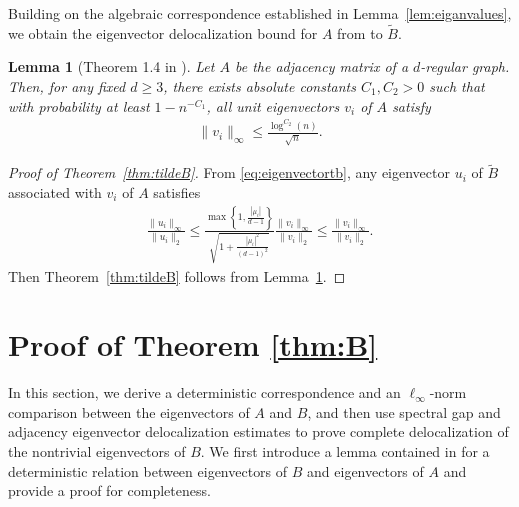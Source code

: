 \documentclass[11pt,reqno]{amsart}
\newtheorem{lemma}[theorem]{Lemma}
\theoremstyle{definition}
\begin{document}
{Building on the algebraic correspondence established in Lemma~\ref{lem:eiganvalues}, we obtain the eigenvector delocalization bound for $A$ from \cite{huang2021spectrum} to $\tilde B$.}

\begin{lemma}[Theorem 1.4 in \cite{huang2021spectrum}] \label{lem:A_delocalization}
{Let $A$ be the adjacency matrix of a $d$-regular graph.} Then, for any fixed $d\geq 3$, there exists absolute constants $C_1, C_2>0$ such that with probability at least $1-n^{-C_1}$, all unit eigenvectors $v_i$ of $A$ {satisfy}
    \begin{align}
        \|v_i\|_{\infty}\leq \frac{\log^{C_2}(n)}{\sqrt n}.
    \end{align}
\end{lemma}


\begin{proof}[Proof of Theorem~\ref{thm:tildeB}]
    From \eqref{eq:eigenvectortb}, any eigenvector $u_i$ of $\tilde B$ associated with $v_i$ of $A$ satisfies
    \begin{align}
        \frac{\|u_i\|_{\infty}}{\|u_i\|_2} \leq \frac{\max \left\{ 1, \frac{|\mu_i|}{d-1}\right\}}{\sqrt{1+\frac{|\mu_i|^2}{(d-1)^2}}}\frac{\|v_i\|_{\infty}}{\|v_i\|_2}\leq \frac{\|v_i\|_{\infty}}{\|v_i\|_2}.
    \end{align}
    Then Theorem~\ref{thm:tildeB} follows from Lemma~\ref{lem:A_delocalization}.
\end{proof}






\section{Proof of Theorem \ref{thm:B}}
\label{sec:thm3}


{In this section, we derive a deterministic correspondence and an $\ell_\infty$-norm comparison between the eigenvectors of $A$ and $B$, and then use spectral gap and adjacency eigenvector delocalization estimates to prove complete delocalization of the nontrivial eigenvectors of $B$.}
We first introduce a lemma contained in \cite{lubetzky2016cutoff} for a deterministic relation between eigenvectors of $B$ and eigenvectors of $A$ and provide a proof for completeness.
\end{document}
